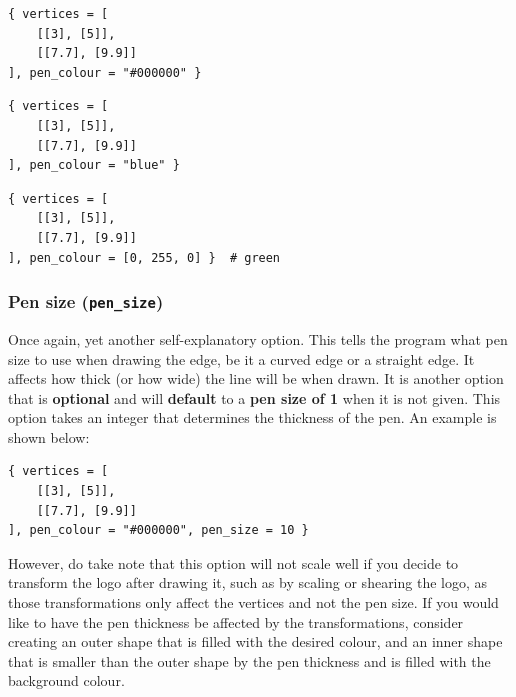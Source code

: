 \documentclass[11pt]{article}
\begin{document}
\begin{verbatim}
{ vertices = [
    [[3], [5]],
    [[7.7], [9.9]]
], pen_colour = "#000000" }
\end{verbatim}

\begin{verbatim}
{ vertices = [
    [[3], [5]],
    [[7.7], [9.9]]
], pen_colour = "blue" }
\end{verbatim}

\begin{verbatim}
{ vertices = [
    [[3], [5]],
    [[7.7], [9.9]]
], pen_colour = [0, 255, 0] }  # green
\end{verbatim}

 \newpage

\subsubsection{Pen size (\texttt{pen\_size})}
\label{sec:orga70cd96}
Once again, yet another self-explanatory option. This tells the program what pen size to use when drawing the edge, be it a curved edge or a straight edge. It affects how thick (or how wide) the line will be when drawn. It is another option that is \textbf{optional} and will \textbf{default} to a \textbf{pen size of 1} when it is not given. This option takes an integer that determines the thickness of the pen. An example is shown below:

\begin{verbatim}
{ vertices = [
    [[3], [5]],
    [[7.7], [9.9]]
], pen_colour = "#000000", pen_size = 10 }
\end{verbatim}

 \noindent However, do take note that this option will not scale well if you decide to transform the logo after drawing it, such as by scaling or shearing the logo, as those transformations only affect the vertices and not the pen size. If you would like to have the pen thickness be affected by the transformations, consider creating an outer shape that is filled with the desired colour, and an inner shape that is smaller than the outer shape by the pen thickness and is filled with the background colour.

 \newpage
\end{document}
